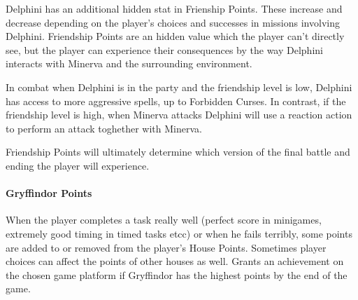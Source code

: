 Delphini has an additional hidden stat in Frienship Points. These increase and decrease depending on the player's choices and successes in missions involving Delphini. Friendship Points are an hidden value which the player can't directly see, but the player can experience their consequences by the way Delphini interacts with Minerva and the surrounding environment.

In combat when Delphini is in the party and the friendship level is low, Delphini has access to more aggressive spells, up to Forbidden Curses. In contrast, if the friendship level is high, when Minerva attacks Delphini will use a reaction action to perform an attack toghether with Minerva.

Friendship Points will ultimately determine which version of the final battle and ending the player will experience.

\paragraph{Gryffindor Points}

When the player completes a task really well (perfect score in minigames, extremely good timing in timed tasks etcc) or when he fails terribly, some points are added to or removed from the player's House Points. Sometimes player choices can affect the points of other houses as well.
Grants an achievement on the chosen game platform if Gryffindor has the highest points by the end of the game.

\pagebreak